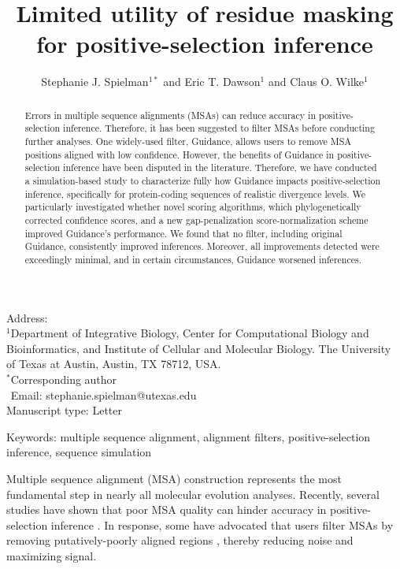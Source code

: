\documentclass[11pt]{article}
\begin{document}
\title{\textbf{Limited utility of residue masking for positive-selection inference}}
\author{Stephanie J. Spielman$^{1*}$ and Eric T. Dawson$^{1}$ and Claus O. Wilke$^{1}$}
\date{}

\maketitle
\noindent
Address:\\
$^1$Department of Integrative Biology, Center for Computational Biology and Bioinformatics, and Institute of Cellular and Molecular Biology.
The University of Texas at Austin, Austin, TX 78712, USA.\\

\bigskip
\noindent
$^*$Corresponding author\\
$\phantom{^*}$Email: stephanie.spielman@utexas.edu\\

\bigskip
\noindent
Manuscript type: Letter

\bigskip
\noindent Keywords: multiple sequence alignment, alignment filters, positive-selection inference, sequence simulation

\newpage
\begin{abstract}
Errors in multiple sequence alignments (MSAs) can reduce accuracy in positive-selection inference. Therefore, it has been suggested to filter MSAs before conducting further analyses. One widely-used filter, Guidance, allows users to remove MSA positions aligned with low confidence. However, the benefits of Guidance in positive-selection inference have been disputed in the literature. Therefore, we have conducted a simulation-based study to characterize fully how Guidance impacts positive-selection inference, specifically for protein-coding sequences of realistic divergence levels. We particularly investigated whether novel scoring algorithms, which phylogenetically corrected confidence scores, and a new gap-penalization score-normalization scheme improved Guidance's performance. We found that no filter, including original Guidance, consistently improved inferences. Moreover, all improvements detected were exceedingly minimal, and in certain circumstances, Guidance worsened inferences. %
\end{abstract}

Multiple sequence alignment (MSA) construction represents the most fundamental step in nearly all molecular evolution analyses. Recently, several studies have shown that poor MSA quality can hinder accuracy in positive-selection inference \citep{Schneider2009, Fletcher2010, MarkovaRaina2011}. In response, some have advocated that users filter MSAs by removing putatively-poorly aligned regions \citep{Privman2012,Jordan2012}, thereby reducing noise and maximizing signal.
\end{document}
